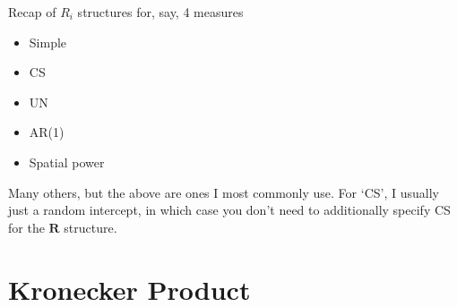 \documentclass[
  9pt,
  ignorenonframetext,
]{beamer}
\providecommand{\tightlist}{%
  \setlength{\itemsep}{0pt}\setlength{\parskip}{0pt}}
\begin{document}
\begin{frame}{Recap of \(R_i\) structures for, say, 4 measures}
\protect\hypertarget{recap-of-r_i-structures-for-say-4-measures}{}
\begin{itemize}
\tightlist
\item
  Simple
\end{itemize}

\vspace{\baselineskip}
\vspace{\baselineskip}

\begin{itemize}
\tightlist
\item
  CS
\end{itemize}

\vspace{\baselineskip}
\vspace{\baselineskip}

\begin{itemize}
\tightlist
\item
  UN
\end{itemize}

\vspace{\baselineskip}
\vspace{\baselineskip}

\begin{itemize}
\tightlist
\item
  AR(1)
\end{itemize}

\vspace{\baselineskip}
\vspace{\baselineskip}

\begin{itemize}
\tightlist
\item
  Spatial power
\end{itemize}

\vspace{\baselineskip}
\vspace{\baselineskip}

Many others, but the above are ones I most commonly use. For `CS', I
usually just a random intercept, in which case you don't need to
additionally specify CS for the \(\pmb R\) structure.
\end{frame}

\hypertarget{kronecker-product}{%
\section{Kronecker Product}\label{kronecker-product}}
\end{document}
